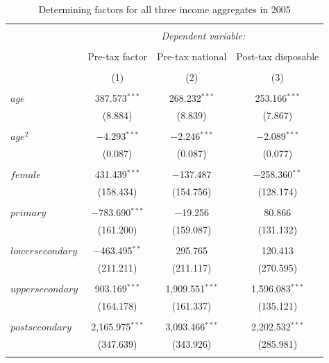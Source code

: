 \documentclass[a4paper]{article}\usepackage[]{graphicx}\usepackage[]{color}
\begin{document}
\begin{table}[H] \centering 
  \caption{Determining factors for all three income aggregates in 2005} 
  \label{ols2005} 
\begin{tabular}{@{\extracolsep{5pt}}lccc} 
\\[-1.8ex]\hline 
\hline \\[-1.8ex] 
 & \multicolumn{3}{c}{\textit{Dependent variable:}} \\ 
\cline{2-4} 
\\[-1.8ex] & Pre-tax factor & Pre-tax national & Post-tax disposable \\ 
\\[-1.8ex] & (1) & (2) & (3)\\ 
\hline \\[-1.8ex] 
 $age$ & 387.573$^{***}$ & 268.232$^{***}$ & 253.166$^{***}$ \\ 
  & (8.884) & (8.839) & (7.867) \\ 
  & & & \\ 
 $age^2$ & $-$4.293$^{***}$ & $-$2.246$^{***}$ & $-$2.089$^{***}$ \\ 
  & (0.087) & (0.087) & (0.077) \\ 
  & & & \\ 
 $female$ & 431.439$^{***}$ & $-$137.487 & $-$258.360$^{**}$ \\ 
  & (158.434) & (154.756) & (128.174) \\ 
  & & & \\ 
 $primary$ & $-$783.690$^{***}$ & $-$19.256 & 80.866 \\ 
  & (161.200) & (159.087) & (131.132) \\ 
  & & & \\ 
 $lower secondary$ & $-$463.495$^{**}$ & 295.765 & 120.413 \\ 
  & (211.211) & (211.117) & (270.595) \\ 
  & & & \\ 
 $upper secondary$ & 903.169$^{***}$ & 1,909.551$^{***}$ & 1,596.083$^{***}$ \\ 
  & (164.178) & (161.337) & (135.121) \\ 
  & & & \\ 
 $post secondary$ & 2,165.975$^{***}$ & 3,093.466$^{***}$ & 2,202.532$^{***}$ \\ 
  & (347.639) & (343.926) & (285.981) \\ 
  & & & \\ 

\end{tabular}
\end{table}
\end{document}
